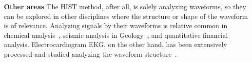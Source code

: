 \textbf{Other areas}
The HIST method, after all, is solely analyzing waveforms, so they can be explored in other disciplines where the structure or shape of the waveform is of relevance.  Analyzing signals by their waveforms is relative common in chemical analysis~\cite{Skoog2000}, seismic analysis in Geology~\cite{Owens1984}, and quantitative financial analysis.  Electrocardiogram EKG, on the other hand, has been extensively processed and studied analyzing the waveform structure~\cite{Stockman1976}.



%
